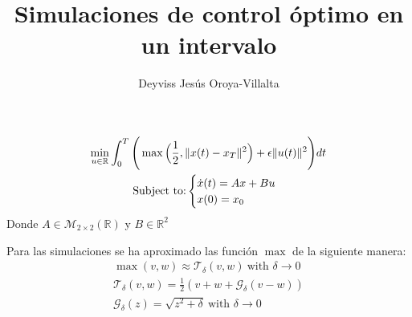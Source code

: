 \documentclass{article}
\author{Deyviss Jesús Oroya-Villalta}
\title{Simulaciones de control óptimo en un intervalo}
\begin{document}
    \maketitle
\begin{gather}
    \min_{u \in \mathbb{R}} \int_0^T 
    \Bigg( \max\Big(\frac 1 2,\|x(t) - x_T\|^2\Big) + \epsilon \| u(t)\|^2 \Bigg)
    dt \\ 
    \notag \text{Subject to:}
    \begin{cases}
        \dot{x}(t) = Ax+Bu \\
        x(0) = x_0
    \end{cases}
\end{gather}
Donde $A \in \mathcal{M}_{2\times 2}(\mathbb{R})$ y $B \in \mathbb{R}^2$
\newline

Para las simulaciones se ha aproximado las función $\max$ de la siguiente manera:
\begin{gather}
    \max(v,w) \approx \mathcal{T}_\delta(v,w)   \ \text{with } \delta \to 0 \\
    \mathcal{T}_\delta(v,w) = \frac{1}{2}(v+w + \mathcal{G}_\delta(v-w)) \\
    \mathcal{G}_\delta(z) = \sqrt{z^2 + \delta}\ \text{with } \delta \to 0
\end{gather}
\end{document}
